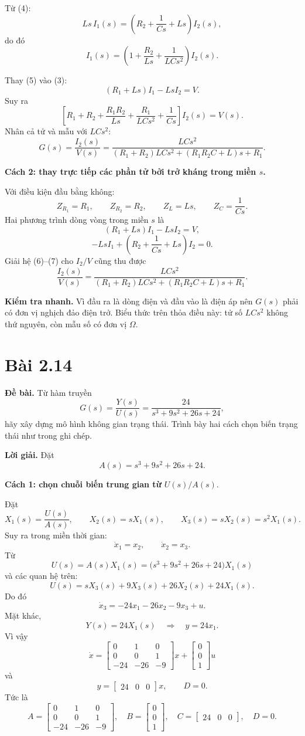 \documentclass[11pt,a4paper]{article}
\newcommand{\baitap}[1]{%
  \Needspace{4\baselineskip}%
  \section*{Bài #1}%
}
\newcommand{\debai}{\par\noindent\textbf{Đề bài.}\enspace}
\newcommand{\loigiai}{\par\smallskip\noindent\textbf{Lời giải.}\enspace}
\begin{document}
Từ (4):
\[
Ls\,I_1(s)
=
\left(R_2+\frac1{Cs}+Ls\right)I_2(s),
\]
do đó
\[
I_1(s)
=
\left(
1+\frac{R_2}{Ls}+\frac{1}{LCs^2}
\right)I_2(s). \tag{5}
\]

Thay (5) vào (3):
\[
(R_1+Ls)I_1-LsI_2=V.
\]
Suy ra
\[
\left[
R_1+R_2+\frac{R_1R_2}{Ls}
+\frac{R_1}{LCs^2}
+\frac1{Cs}
\right]I_2(s)=V(s).
\]
Nhân cả tử và mẫu với $LCs^2$:
\[
\boxed{
G(s)=\frac{I_2(s)}{V(s)}
=
\frac{LCs^2}
{(R_1+R_2)LCs^2+(R_1R_2C+L)s+R_1}
}.
\]

\textbf{Cách 2: thay trực tiếp các phần tử bởi trở kháng trong miền $s$.}

Với điều kiện đầu bằng không:
\[
Z_{R_1}=R_1,\qquad
Z_{R_2}=R_2,\qquad
Z_L=Ls,\qquad
Z_C=\frac1{Cs}.
\]
Hai phương trình dòng vòng trong miền $s$ là
\[
(R_1+Ls)I_1-LsI_2=V, \tag{6}
\]
\[
-LsI_1+\left(R_2+\frac1{Cs}+Ls\right)I_2=0. \tag{7}
\]
Giải hệ (6)--(7) cho $I_2/V$ cũng thu được
\[
\boxed{
\frac{I_2(s)}{V(s)}
=
\frac{LCs^2}
{(R_1+R_2)LCs^2+(R_1R_2C+L)s+R_1}
}.
\]

\textbf{Kiểm tra nhanh.}
Vì đầu ra là dòng điện và đầu vào là điện áp nên $G(s)$ phải có đơn vị nghịch đảo điện trở. Biểu thức trên thỏa điều này: tử số $LCs^2$ không thứ nguyên, còn mẫu số có đơn vị $\Omega$.



\baitap{2.14}
\debai
Từ hàm truyền
\[
G(s)=\frac{Y(s)}{U(s)}
=\frac{24}{s^3+9s^2+26s+24},
\]
hãy xây dựng mô hình không gian trạng thái. Trình bày hai cách chọn biến trạng thái như trong ghi chép.

\loigiai
Đặt
\[
A(s)=s^3+9s^2+26s+24.
\]

\textbf{Cách 1: chọn chuỗi biến trung gian từ }$U(s)/A(s)$.

Đặt
\[
X_1(s)=\frac{U(s)}{A(s)},\qquad
X_2(s)=sX_1(s),\qquad
X_3(s)=sX_2(s)=s^2X_1(s).
\]
Suy ra trong miền thời gian:
\[
\dot x_1=x_2,\qquad \dot x_2=x_3.
\]
Từ
\[
U(s)=A(s)X_1(s)
=\big(s^3+9s^2+26s+24\big)X_1(s)
\]
và các quan hệ trên:
\[
U(s)=sX_3(s)+9X_3(s)+26X_2(s)+24X_1(s).
\]
Do đó
\[
\dot x_3=-24x_1-26x_2-9x_3+u.
\]
Mặt khác,
\[
Y(s)=24X_1(s)
\quad\Longrightarrow\quad
y=24x_1.
\]
Vì vậy
\[
\boxed{
\dot x=
\begin{bmatrix}
0&1&0\\
0&0&1\\
-24&-26&-9
\end{bmatrix}x+
\begin{bmatrix}
0\\0\\1
\end{bmatrix}u
}
\]
và
\[
\boxed{
y=
\begin{bmatrix}
24&0&0
\end{bmatrix}x,\qquad D=0.
}
\]
Tức là
\[
A=
\begin{bmatrix}
0&1&0\\
0&0&1\\
-24&-26&-9
\end{bmatrix},\quad
B=
\begin{bmatrix}
0\\0\\1
\end{bmatrix},\quad
C=
\begin{bmatrix}
24&0&0
\end{bmatrix},\quad D=0.
\]
\end{document}
